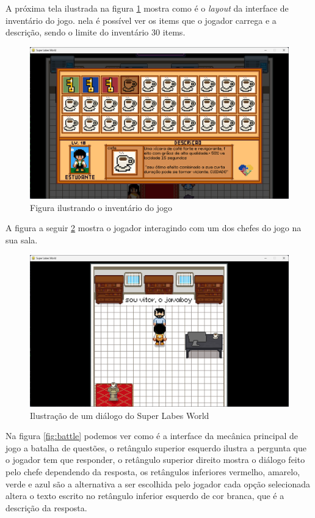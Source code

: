 A próxima tela ilustrada na figura \ref{fig:inventory} mostra como é o \textit{layout} da interface de inventário do jogo. nela é possível ver os items que o jogador carrega e a descrição, sendo o limite do inventário 30 items. 
\begin{figure}[t]
    \centering
    \includegraphics[width=1\linewidth]{figuras/inventory.png}
    \caption{Figura ilustrando o inventário do jogo}
    \label{fig:inventory}
\end{figure}
\clearpage
A figura a seguir \ref{fig:dialog} mostra o jogador interagindo com um dos chefes do jogo na sua sala.

\begin{figure}[h!]
    \centering
    \includegraphics[width=1\linewidth]{figuras/dialog.png}
    \caption{Ilustração de um diálogo do Super Labes World}
    \label{fig:dialog}
\end{figure}
Na figura \ref{fig:battle} podemos ver como é a interface da mecânica principal de jogo a batalha de questões, o retângulo superior esquerdo ilustra a pergunta que o jogador tem que responder, o retângulo superior direito mostra o diálogo feito pelo chefe dependendo da resposta, os retângulos inferiores vermelho, amarelo, verde e azul são a alternativa a ser escolhida pelo jogador cada opção selecionada altera o texto escrito no retângulo inferior esquerdo de cor branca, que é a descrição da resposta. 

